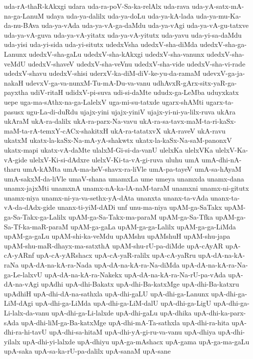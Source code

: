 {uda-rA-thaR-kAkxgi
udara
uda-ra-poV-Sa-ka-relAlx
uda-rava
uda-yA-satx-mA-na-ga-LanuM
udaya
uda-ya-dalilx
uda-ya-doLu
uda-ya-kA-lada
uda-ya-mu-Ka-da-nu-BAva
uda-ya-vAda
uda-ya-vA-ga-daMdu
uda-ya-vAgi
uda-ya-vA-gu-tatxve
uda-ya-vA-guva
uda-ya-vA-yitatx
uda-ya-vA-yitutx
uda-yavu
uda-yi-sa-daMdu
uda-yisi
uda-yi-sida
uda-yi-situtx
udedxVsha
udedxV-sha-diMda
udedxV-sha-ga-Lanunx
udedxV-sha-gaLu
udedxV-sha-kAkxgi
udedxV-sha-vanunx
udedxV-sha-veMdU
udedxV-shaveV
udedxV-sha-veVnu
udedxV-sha-vide
udedxV-sha-vi-rade
udedxV-shavu
udedxV-shisi
uderxV-ka-diM-diV-ke-yu-da-ramaM
udevxV-ga-ja-nakaH
udevxV-ga-va-nunxM-Tu-mA-Du-va-vanu
udhAvxR-gArx-sitx-yaR-ga-payxtha
udiV-ritaH
udidxV-pi-suva
udi-si-daMte
ududx-ga-LeMba
uduyxkatx
uepe
uga-ma-sAthx-na-ga-LalelxV
uga-mi-su-tatxde
ugarx-shAMti
ugarx-ta-pasusx
ugu-La-di-duRdu
ujajx-yini
ujajx-yiniV
ujajx-yi-ni-ya-lilx-ruva
ukAra
ukAraM
ukA-ra-dalilx
ukA-ra-parx-Na-vavu
ukA-ra-sa-tavx-maM-ta-ri-kaSx-maM-ta-rA-temxY-cACx-shakitxH
ukA-ra-tatatxvX
ukA-raveV
ukA-ravu
ukatxM
ukatx-la-kaSx-Na-mA-yA-shakwtx
ukatx-la-kaSx-Na-saM-panonxV
ukatx-mapi
ukatx-vA-daMte
ulalxM-Gi-si-da-vanU
ulelxKa
ulelxVKa
ulelxV-Ka-vA-gide
ulelxV-Ki-si-dAdxre
ulelxV-Ki-ta-vA-gi-ruva
uluhu
umA
umA-dhi-nA-tharu
umA-kAMta
umA-ma-heV-shavx-ra-liVle
umA-pa-tayeV
umA-sa-hAyaM
umA-sakxM-da-liVle
umaV-shana
umamxLa
ume
umeya
unamxda
unamx-dana
unamx-jajxMti
unamxnA
unamx-nA-ka-lA-naM-taraM
unamxni
unamx-ni-gitutx
unamx-niya
unamx-ni-ya-va-sethx-yA-dAta
unanxta
unanx-ta-vAda
unanx-ta-vA-da-dAdx-gide
unanx-ti-yiM-dADi
unf
unu-ma-niya
upAM-ga-SaTakx
upAM-ga-Sa-Takx-ga-Lalilx
upAM-ga-Sa-Takx-ma-paraM
upAM-ga-Sa-Tfka
upAM-ga-Sa-Tf-ka-maR-paraM
upAM-ga-gaLa
upAM-ga-ga-Lalilx
upAM-ga-ga-LiMda
upAM-ga-gaLu
upAM-shi-ka-veMdu
upAMshu
upAMshuH
upAM-shu-japa
upAM-shu-maR-dhayx-ma-satxthA
upAM-shu-rU-pa-diMde
upA-cAyAR
upA-cA-yARnf
upA-cA-yARshacx
upA-cA-yaR-ralilx
upA-cA-yaRru
upA-dA-na-kA-raNa
upA-dA-na-kA-ra-Nada
upA-dA-na-kA-ra-Na-diMda
upA-dA-na-kA-ra-Na-ga-Le-lalxvU
upA-dA-na-kA-ra-Nakekx
upA-dA-na-kA-ra-Na-rU-pa-vAda
upA-dA-na-vAgi
upAdhi
upA-dhi-Bakatx
upA-dhi-Ba-katxMge
upA-dhi-Ba-katxru
upAdhiH
upA-dhi-dA-na-sathxla
upA-dhi-gaLU
upA-dhi-ga-Lanunx
upA-dhi-ga-LiM-dAgi
upA-dhi-ga-LiMda
upA-dhi-ga-LiM-dalU
upA-dhi-ga-LigU
upA-dhi-ga-Li-lalx-da-vanu
upA-dhi-ga-Li-lalxde
upA-dhi-gaLu
upA-dhika
upA-dhi-ka-parx-sAda
upA-dhi-liM-ga-Ba-katxMge
upA-dhi-mA-Ta-sathxla
upA-dhi-ra-hita
upA-dhi-ra-hi-tavU
upA-dhi-sa-hitaM
upA-dhi-yA-gi-ru-va-vanu
upA-dhiya
upA-dhi-yilalx
upA-dhi-yi-lalxde
upA-dhiyu
upA-ga-mAshacx
upA-gama
upA-ga-ma-gaLu
upA-saka
upA-sa-ka-rU-pa-dalilx
upA-sanaM
upA-sane
}
